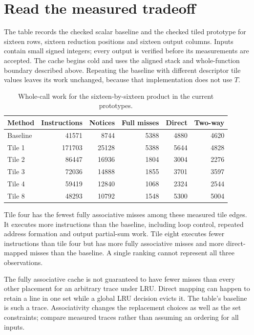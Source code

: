 \section{Read the measured tradeoff}
The table records the checked scalar baseline and the checked tiled prototype for
sixteen rows, sixteen reduction positions and sixteen output columns. Inputs contain
small signed integers; every output is verified before its measurements are accepted.
The cache begins cold and uses the aligned stack and whole-function boundary described
above. Repeating the baseline with different descriptor tile values leaves its work
unchanged, because that implementation does not use \(T\).

\begin{table}[htbp]
  \centering
  \caption{Whole-call work for the sixteen-by-sixteen product in the current prototypes.}
  \small
  \begin{tabular}{lrrrrr}
    \toprule
    Method   & Instructions & Notices & Full misses & Direct & Two-way \\
    \midrule
    Baseline & 41571        & 8744    & 5388        & 4880   & 4620    \\
    Tile 1   & 171703       & 25128   & 5388        & 5644   & 4828    \\
    Tile 2   & 86447        & 16936   & 1804        & 3004   & 2276    \\
    Tile 3   & 72036        & 14888   & 1855        & 3701   & 3597    \\
    Tile 4   & 59419        & 12840   & 1068        & 2324   & 2544    \\
    Tile 8   & 48293        & 10792   & 1548        & 5300   & 5004    \\
    \bottomrule
  \end{tabular}
\end{table}

Tile four has the fewest fully associative misses among these measured tile edges.
It executes more instructions than the baseline, including loop control, repeated
address formation and output partial-sum work. Tile eight executes fewer instructions
than tile four but has more fully associative misses and more direct-mapped misses
than the baseline. A single ranking cannot represent all three observations.

The fully associative cache is not guaranteed to have fewer misses than every
other placement for an arbitrary trace under LRU. Direct mapping can happen to
retain a line in one set while a global LRU decision evicts it. The table's baseline
is such a trace. Associativity changes the replacement choices as well as the set
constraints; compare measured traces rather than assuming an ordering for all inputs.

